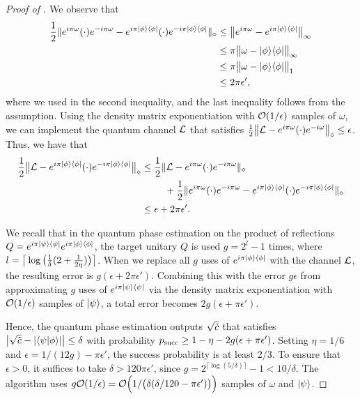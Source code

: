 \begin{proof}[Proof of ]
We observe that 
\begin{align}
    \frac{1}{2}\|e^{i\pi\omega}(\cdot)e^{-i\pi\omega} - e^{i\pi|\phi\rangle\langle\phi|}(\cdot)e^{-i\pi|\phi\rangle\langle\phi|}\|_\diamond
    &\leq \big\|e^{i\pi\omega} - e^{i\pi|\phi\rangle\langle\phi|}\big\|_\infty \\
    &\leq \pi \big\|\omega - |\phi\rangle\langle\phi|\big\|_\infty \\
    &\leq \pi \big\|\omega - |\phi\rangle\langle\phi|\big\|_1 \\
    &\leq 2\pi \epsilon',
\end{align}
where we used  in the second inequality, and the last inequality follows from the assumption.
Using the density matrix exponentiation with ${\mathcal{O}}(1/\epsilon)$ samples of $\omega$, we can implement the quantum channel ${\mathcal{L}}$ that satisfies $\frac{1}{2}\big\|{\mathcal{L}} - e^{i\pi\omega}(\cdot)e^{-i\omega}\big\|_\diamond \leq \epsilon$.
Thus, we have that
\begin{align}
    \f{1}{2}\big\|\cL - e^{i\pi\ketbra{\phi}{\phi}}(\cdot)e^{-i\pi\ketbra{\phi}{\phi}}\big\|_\diamond 
    &\leq \f{1}{2}\|\cL - e^{i\pi\omega}(\cdot)e^{-i\pi\omega}\|_\diamond  \notag\\
    &\hspace{2pc}+\f{1}{2}\|e^{i\pi\omega}(\cdot)e^{-i\pi\omega} - e^{i\pi\ketbra{\phi}{\phi}}(\cdot)e^{-i\pi\ketbra{\phi}{\phi}}\|_\diamond \\
    &\leq \epsilon + 2\pi \epsilon'.
\end{align}

We recall that in the quantum phase estimation on the product of reflections $Q = e^{i\pi|\psi\rangle\langle\psi|} e^{i\pi|\phi\rangle\langle\phi|}$, the target unitary $Q$ is used $g = 2^l -1 $ times, where $l = \big\lceil\log{\big(\frac{1}{\delta}(2+\frac{1}{2\eta})\big)}\big\rceil$.
When we replace all $g$ uses of $e^{i\pi|\phi\rangle\langle\phi|}$ with the channel ${\mathcal{L}}$, the resulting error is $g(\epsilon + 2\pi \epsilon')$.
Combining this with the error $g\epsilon$ from approximating $g$ uses of $e^{i\pi|\psi\rangle\langle\psi|}$ via the density matrix exponentiation with ${\mathcal{O}}(1/\epsilon)$ samples of $|\psi\rangle$, a total error becomes $2g(\epsilon + \pi \epsilon')$. 

Hence, the quantum phase estimation outputs $\sqrt{\tilde{c}}$ that satisfies $\big|\sqrt{\tilde{c}} - |\langle \psi \vert \phi \rangle|\big| \leq \delta$ with probability $p_{\rm succ} \geq 1 - \eta - 2g(\epsilon + \pi \epsilon')$.
Setting $\eta = 1/6$ and $\epsilon = 1/(12g) - \pi\epsilon'$, the success probability is at least $2/3$.
To ensure that $\epsilon > 0$, it suffices to take $\delta > 120\pi\epsilon'$, since $g = 2^{\lceil \log{(5/\delta)}\rceil}-1 < 10/\delta$.
The algorithm uses $g{\mathcal{O}}(1/\epsilon) = {\mathcal{O}}\Big(1/\big(\delta(\delta/120 - \pi\epsilon')\big)\Big)$ samples of $\omega$ and $|\psi\rangle$.
\end{proof}




